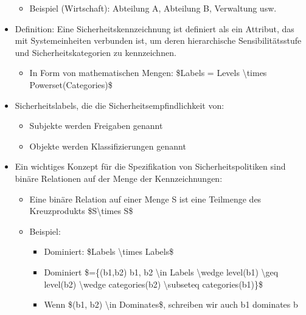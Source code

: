 \documentclass[a4paper]{article}
\begin{document}
\begin{multicols}{3}
\begin{itemize}
              \begin{itemize}
                  \item
                        Beispiel (Wirtschaft): Abteilung A, Abteilung B, Verwaltung usw.
              \end{itemize}
        \item
              Definition: Eine Sicherheitskennzeichnung ist definiert als ein
              Attribut, das mit Systemeinheiten verbunden ist, um deren
              hierarchische Sensibilitätsstufe und Sicherheitskategorien zu
              kennzeichnen.

              \begin{itemize}
                  \item
                        In Form von mathematischen Mengen: \$Labels = Levels
                        \textbackslash times Powerset(Categories)\$
              \end{itemize}
        \item
              Sicherheitslabels, die die Sicherheitsempfindlichkeit von:

              \begin{itemize}
                  \item
                        Subjekte werden Freigaben genannt
                  \item
                        Objekte werden Klassifizierungen genannt
              \end{itemize}
        \item
              Ein wichtiges Konzept für die Spezifikation von Sicherheitspolitiken
              sind binäre Relationen auf der Menge der Kennzeichnungen:

              \begin{itemize}
                  \item
                        Eine binäre Relation auf einer Menge S ist eine Teilmenge des
                        Kreuzprodukts \$S\textbackslash times S\$
                  \item
                        Beispiel:

                        \begin{itemize}
                            \item
                                  Dominiert: \$Labels \textbackslash times Labels\$
                            \item
                                  Dominiert \$=\{(b1,b2) \textbar{} b1, b2 \textbackslash in Labels
                                  \textbackslash wedge level(b1) \textbackslash geq level(b2)
                                  \textbackslash wedge categories(b2) \textbackslash subseteq
                                  categories(b1)\}\$
                            \item
                                  Wenn \$(b1, b2) \textbackslash in Dominates\$, schreiben wir auch
                                  b1 dominates b
                        \end{itemize}
              \end{itemize}
    \end{itemize}



\end{multicols}
\end{document}
